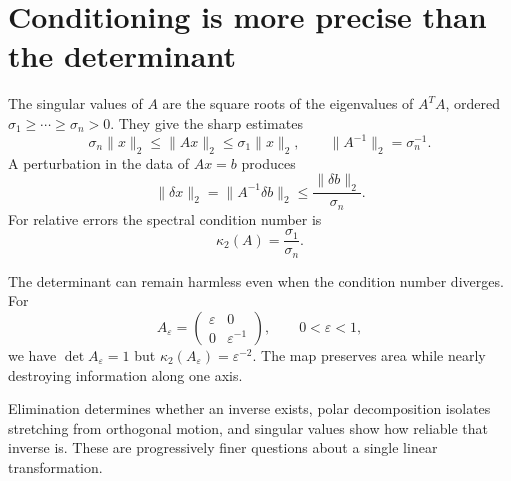 \section{Conditioning is more precise than the determinant}

The singular values of \(A\) are the square roots of the eigenvalues of \(A^TA\), ordered
\(\sigma_1\ge\cdots\ge\sigma_n>0\). They give the sharp estimates
\[
 \sigma_n\|x\|_2\le\|Ax\|_2\le\sigma_1\|x\|_2,
 \qquad \|A^{-1}\|_2=\sigma_n^{-1}.
\]
A perturbation in the data of \(Ax=b\) produces
\[
 \|\delta x\|_2=\|A^{-1}\delta b\|_2
 \le\frac{\|\delta b\|_2}{\sigma_n}.
\]
For relative errors the spectral condition number is
\[
 \kappa_2(A)=\frac{\sigma_1}{\sigma_n}.
\]

The determinant can remain harmless even when the condition number diverges. For
\[
 A_\varepsilon=\begin{pmatrix}\varepsilon&0\\0&\varepsilon^{-1}\end{pmatrix},
 \qquad 0<\varepsilon<1,
\]
we have \(\det A_\varepsilon=1\) but \(\kappa_2(A_\varepsilon)=\varepsilon^{-2}\). The map preserves area while nearly destroying information along one axis.

Elimination determines whether an inverse exists, polar decomposition isolates stretching from orthogonal motion, and singular values show how reliable that inverse is. These are progressively finer questions about a single linear transformation.
